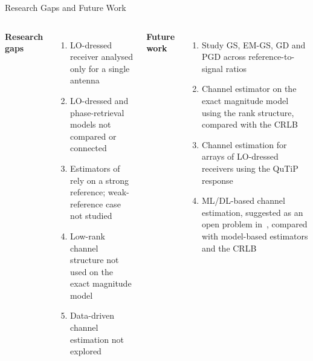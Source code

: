 \documentclass[10pt,xcolor=x11names,compress,aspectratio=169]{beamer}
\begin{document}
\begin{frame}{Research Gaps and Future Work}
\begin{columns}[T]
\small\textbf{Research gaps}
\begin{enumerate}\footnotesize\setlength\itemsep{4pt}
  \item LO-dressed receiver analysed only for a single antenna~\cite{chen2025harnessing}
  \item LO-dressed and phase-retrieval models not compared or connected
  \item Estimators of~\cite{xu2025channel} rely on a strong reference; weak-reference case not studied
  \item Low-rank channel structure not used on the exact magnitude model
  \item Data-driven channel estimation not explored
\end{enumerate}
\small\textbf{Future work}
\begin{enumerate}\footnotesize\setlength\itemsep{4pt}
  \item Study GS, EM-GS, GD and PGD across reference-to-signal ratios
  \item Channel estimator on the exact magnitude model using the rank structure, compared with the CRLB
  \item Channel estimation for arrays of LO-dressed receivers using the QuTiP response
  \item ML/DL-based channel estimation, suggested as an open problem in~\cite{cui2026rare}, compared with model-based estimators and the CRLB
\end{enumerate}
\end{columns}
\end{frame}
\end{document}
